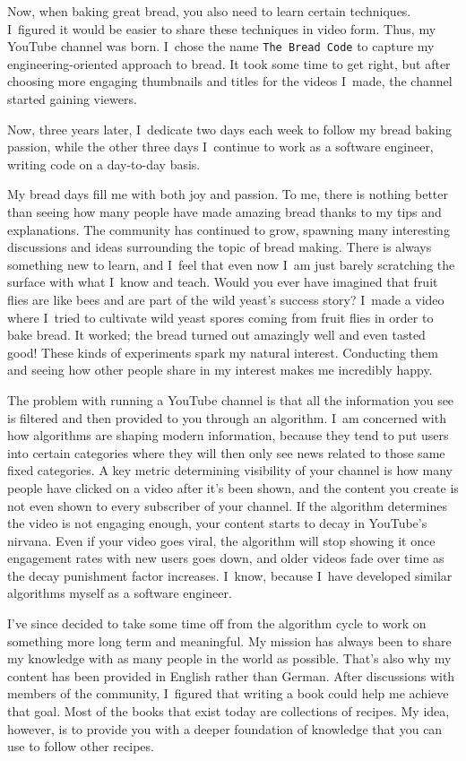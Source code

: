 Now, when baking great bread, you also need to learn certain techniques. I~figured it would be
easier to share these techniques in video form. Thus, my YouTube channel was born. I~chose
the name \texttt{The Bread Code} to capture my engineering-oriented approach to bread. It took some
time to get right, but after choosing more engaging thumbnails and titles for
the videos I~made, the channel started gaining viewers.

Now, three years later, I~dedicate two days each week to follow my bread baking passion, while
the other three days I~continue to work as a software engineer, writing code on a day-to-day
basis.

My bread days fill me with both joy and passion. To me, there is nothing better than seeing
how many people have made amazing bread thanks to my tips and explanations. The community has
continued to grow, spawning many interesting discussions and ideas surrounding the topic of
bread making. There is always something new to learn, and I~feel that even now I~am just barely
scratching the surface with what I~know and teach. Would you ever have imagined that fruit
flies are like bees and are part of the wild yeast's success story? I~made a video where
I~tried to cultivate wild yeast spores coming from fruit flies in order
to bake bread. It worked; the bread turned out amazingly well and even tasted good! These kinds of
experiments spark my natural interest. Conducting them and seeing how other people share in my
interest makes me incredibly happy.

The problem with running a YouTube channel is that all the information
you see is filtered and then provided to you through an algorithm. I~am concerned
with how algorithms are shaping modern information, because they tend to
put users into certain categories where they will then only see news related to
those same fixed categories. A key metric determining visibility of your channel is how many
people have clicked on a video after it's been shown, and the content you create
is not even shown to every subscriber of your channel. If the algorithm determines the video
is not engaging enough, your content starts to decay in YouTube's nirvana. Even if your video
goes viral, the algorithm will stop showing it once engagement rates with new users goes down,
and older videos fade over time as the decay punishment factor increases. I~know, because
I~have developed similar algorithms myself as a software engineer.

I've since decided to take some time off from the algorithm cycle to work on something more
long term and meaningful. My mission has always been to share my knowledge with as many people
in the world as possible. That's also why my content has been provided in English rather than
German. After discussions with members of the community, I~figured that writing a book could
help me achieve that goal. Most of the books that exist today are collections of recipes. My
idea, however, is to provide you with a deeper foundation of knowledge that you can use to
follow other recipes.

